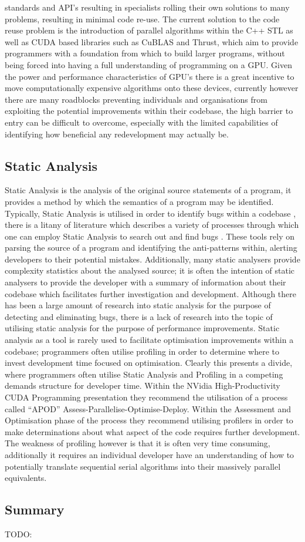 standards and API’s resulting in specialists rolling their own solutions to many problems, resulting
in minimal code re-use. The current solution to the code reuse problem is the introduction of
parallel algorithms within the C++ STL as well as CUDA based libraries such as CuBLAS and Thrust,
which aim to provide programmers with a foundation from which to build larger programs, without
being forced into having a full understanding of programming on a GPU. Given the power and
performance characteristics of GPU’s there is a great incentive to move computationally expensive
algorithms onto these devices, currently however there are many roadblocks preventing individuals
and organisations from exploiting the potential improvements within their codebase, the high barrier
to entry can be difficult to overcome, especially with the limited capabilities of identifying how
beneficial any redevelopment may actually be.

\subsection{Static Analysis}
Static Analysis is the analysis of the original source statements of a program, it provides a method
by which the semantics of a program may be identified.  Typically, Static Analysis is utilised in
order to identify bugs within a codebase \cite{bessey2010few}, there is a litany of literature which
describes a variety of processes through which one can employ Static Analysis to search out and find
bugs \cite{ball2001automatically} \cite{bush2000static}. These tools rely on parsing the source of a
program and identifying the anti-patterns within, alerting developers to their potential mistakes.
Additionally, many static analysers provide complexity statistics about the analysed source; it is
often the intention of static analysers to provide the developer with a summary of information about
their codebase which facilitates further investigation and development.  Although there has been a
large amount of research into static analysis for the purpose of detecting and eliminating bugs,
there is a lack of research into the topic of utilising static analysis for the purpose of
performance improvements.  Static analysis as a tool is rarely used to facilitate optimisation
improvements within a codebase; programmers often utilise profiling in order to determine where to
invest development time focused on optimisation.  Clearly this presents a divide, where programmers
often utilise Static Analysis and Profiling in a competing demands structure for developer time.
Within the NVidia High-Productivity CUDA Programming presentation \cite{nvidiapresentation}
they recommend the utilisation of a process called “APOD” Assess-Parallelise-Optimise-Deploy.
Within the Assessment and Optimisation phase of the process they recommend utilising profilers in
order to make determinations about what aspect of the code requires further development. The
weakness of profiling however is that it is often very time consuming, additionally it requires an
individual developer have an understanding of how to potentially translate sequential serial
algorithms into their massively parallel equivalents. 
 
\subsection{Summary}
TODO:
